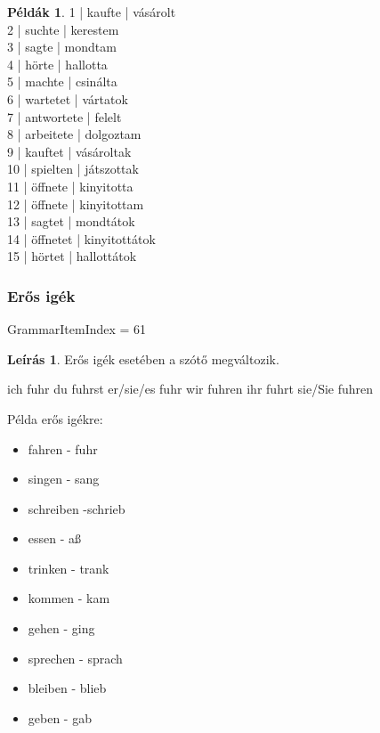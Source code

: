 \documentclass{article}
\theoremstyle{definition}
\newtheorem*{exmp}{Példák}
\newtheorem*{desc}{Leírás}
\begin{document}
\begin{exmp}
1 | kaufte | vásárolt\\
2 | suchte | kerestem\\
3 | sagte | mondtam\\
4 | hörte | hallotta\\
5 | machte | csinálta\\
6 | wartetet | vártatok\\
7 | antwortete | felelt\\
8 | arbeitete | dolgoztam\\
9 | kauftet | vásároltak\\
10 | spielten | játszottak\\
11 | öffnete | kinyitotta\\
12 | öffnete | kinyitottam\\
13 | sagtet | mondtátok\\
14 | öffnetet | kinyitottátok\\
15 | hörtet | hallottátok\\
\end{exmp}

\subsubsection{Erős igék}

GrammarItemIndex = 61

\begin{desc}
Erős igék esetében a szótő megváltozik.

ich fuhr
du fuhrst
er/sie/es fuhr
wir fuhren
ihr fuhrt
sie/Sie fuhren

Példa erős igékre:
\begin{itemize}
\item fahren - fuhr
\item singen - sang
\item schreiben -schrieb
\item essen - aß
\item trinken - trank
\item kommen - kam
\item gehen - ging
\item sprechen - sprach
\item bleiben - blieb
\item geben - gab
\end{itemize}
\end{desc}
\end{document}
